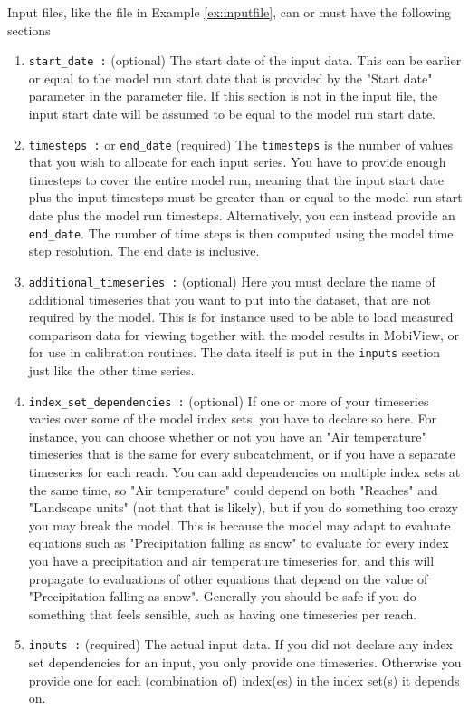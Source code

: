 \documentclass[11pt]{article}
\theoremstyle{definition}
\begin{document}
Input files, like the file in Example \ref{ex:inputfile}, can or must have the following sections
\begin{enumerate}[i]
\item {\tt start\_date :} (optional) The start date of the input data. This can be earlier or equal to the model run start date that is provided by the "Start date" parameter in the parameter file. If this section is not in the input file, the input start date will be assumed to be equal to the model run start date.
\item {\tt timesteps :} or {\tt end\_date} (required) The {\tt timesteps} is the number of values that you wish to allocate for each input series. You have to provide enough timesteps to cover the entire model run, meaning that the input start date plus the input timesteps must be greater than or equal to the model run start date plus the model run timesteps. Alternatively, you can instead provide an {\tt end\_date}. The number of time steps is then computed using the model time step resolution. The end date is inclusive.
\item {\tt additional\_timeseries :} (optional) Here you must declare the name of additional timeseries that you want to put into the dataset, that are not required by the model. This is for instance used to be able to load measured comparison data for viewing together with the model results in MobiView, or for use in calibration routines. The data itself is put in the {\tt inputs} section just like the other time series.
\item {\tt index\_set\_dependencies :} (optional) If one or more of your timeseries varies over some of the model index sets, you have to declare so here. For instance, you can choose whether or not you have an "Air temperature" timeseries that is the same for every subcatchment, or if you have a separate timeseries for each reach. You can add dependencies on multiple index sets at the same time, so "Air temperature" could depend on both "Reaches" and "Landscape units" (not that that is likely), but if you do something too crazy you may break the model. This is because the model may adapt to evaluate equations such as "Precipitation falling as snow" to evaluate for every index you have a precipitation and air temperature timeseries for, and this will propagate to evaluations of other equations that depend on the value of "Precipitation falling as snow". Generally you should be safe if you do something that feels sensible, such as having one timeseries per reach.
\item {\tt inputs :} (required) The actual input data. If you did not declare any index set dependencies for an input, you only provide one timeseries. Otherwise you provide one for each (combination of) index(es) in the index set(s) it depends on.
\end{enumerate}
\end{document}
